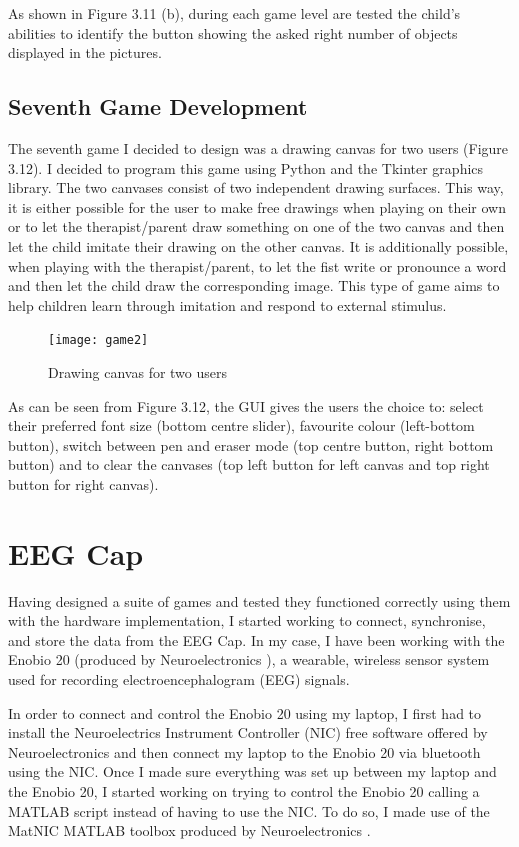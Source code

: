 As shown in Figure 3.11 (b), during each game level are tested the child's abilities to identify the button showing the asked right number of objects displayed in the pictures.  

\subsection{Seventh Game Development}

The seventh game I decided to design was a drawing canvas for two users (Figure 3.12). I decided to program this game using Python and the Tkinter graphics library. The two canvases consist of two independent drawing surfaces. This way, it is either possible for the user to make free drawings when playing on their own or to let the therapist/parent draw something on one of the two canvas and then let the child imitate their drawing on the other canvas. It is additionally possible, when playing with the therapist/parent, to let the fist write or pronounce a word and then let the child draw the corresponding image. This type of game aims to help children learn through imitation and respond to external stimulus.

\begin{figure}[ht!]%
    \centering
    \texttt{[image: game2]}%
    \caption{Drawing canvas for two users}%
\end{figure}

As can be seen from Figure 3.12, the GUI gives the users the choice to: select their preferred font size (bottom centre slider), favourite colour (left-bottom button), switch between pen and eraser mode (top centre button, right bottom button) and to clear the canvases (top left button for left canvas and top right button for right canvas).

\section{EEG Cap}
Having designed a suite of games and tested they functioned correctly using them with the hardware implementation, I started working to connect, synchronise, and store the data from the EEG Cap. In my case, I have been working with the Enobio 20 (produced by Neuroelectronics \cite{Neuroelectronics}), a wearable, wireless sensor system used for recording electroencephalogram (EEG) signals. 

In order to connect and control the Enobio 20 using my laptop, I first had to install the Neuroelectrics Instrument Controller (NIC) free software offered by Neuroelectronics and then connect my laptop to the Enobio 20 via bluetooth using the NIC. Once I made sure everything was set up between my laptop and the Enobio 20, I started working on trying to control the Enobio 20 calling a MATLAB script instead of having to use the NIC. To do so, I made use of the MatNIC MATLAB toolbox produced by Neuroelectronics \cite{MatNIC}.

